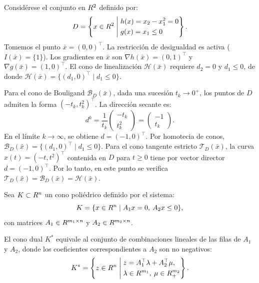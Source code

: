 \begin{example}\label{v1:exa:inclusion_regular_mixta}
 Considérese el conjunto en $R^2$ definido por:
 \[
 D = \left\{ x \in R^2 \mathrel{\Bigg|} \begin{aligned} &h(x) = x_2 - x_1^2 = 0 \\ &g(x) = x_1 \le 0 \end{aligned} \right\}.
 \]
 Tomemos el punto $\bar{x} = (0,0)^\top$. La restricción de desigualdad es activa ($I(\bar{x}) = \{1\}$). Los gradientes en $\bar{x}$ son $\nabla h(\bar{x}) = (0, 1)^\top$ y $\nabla g(\bar{x}) = (1, 0)^\top$. El cono de linealización $\mathcal{H}(\bar{x})$ requiere $d_2 = 0$ y $d_1 \le 0$, de donde $\mathcal{H}(\bar{x}) = \{ (d_1, 0)^\top \mid d_1 \le 0 \}$.

 Para el cono de Bouligand $\mathcal{B}_D(\bar{x})$, dada una sucesión $t_k \to 0^+$, los puntos de $D$ admiten la forma $(-t_k, t_k^2)^\top$. La dirección secante es:
 \[
 d^k = \frac{1}{t_k} \begin{pmatrix} -t_k \\ t_k^2 \end{pmatrix} = \begin{pmatrix} -1 \\ t_k \end{pmatrix}.
 \]
 En el límite $k \to \infty$, se obtiene $d = (-1, 0)^\top$. Por homotecia de conos, $\mathcal{B}_D(\bar{x}) = \{ (d_1, 0)^\top \mid d_1 \le 0 \}$. Para el cono tangente estricto $\mathcal{T}_D(\bar{x})$, la curva $x(t) = (-t, t^2)^\top$ contenida en $D$ para $t \ge 0$ tiene por vector director $d = (-1,0)^\top$. Por lo tanto, en este punto se verifica $\mathcal{T}_D(\bar{x}) = \mathcal{B}_D(\bar{x}) = \mathcal{H}(\bar{x})$.
\end{example}

\begin{lemma}\label{v1:lem:4.2.1}
 Sea $K \subset R^n$ un cono poliédrico definido por el sistema:
 \[
 K = \{ x \in R^n \mid A_1 x = 0, \: A_2 x \le 0 \},
 \]
 con matrices $A_1 \in R^{m_1 \times n}$ y $A_2 \in R^{m_2 \times n}$.
 
 El cono dual $K^*$ equivale al conjunto de combinaciones lineales de las filas de $A_1$ y $A_2$, donde los coeficientes correspondientes a $A_2$ son no negativos:
 \begin{equation}
 K^* = \left\{ z \in R^n \mathrel{\Bigg|} \begin{aligned} &z = A_1^\top \lambda + A_2^\top \mu, \\ &\lambda \in R^{m_1}, \: \mu \in R_+^{m_2} \end{aligned} \right\}.
 \label{v1:eq:4.17}
 \end{equation}
\end{lemma}

